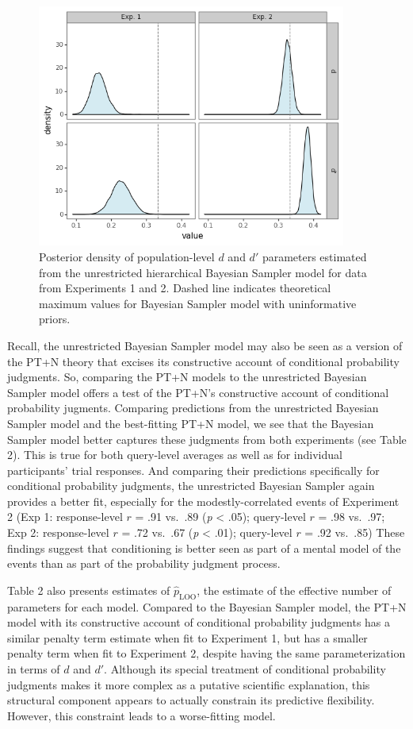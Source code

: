 \documentclass[
  man,floatsintext]{apa6}
\begin{document}
\begin{figure}[ht]
\centering
\includegraphics[width=4in]{plot_params.png}
\caption{Posterior density of population-level $d$  and $d'$ parameters estimated from the unrestricted hierarchical Bayesian Sampler model for data from Experiments 1 and 2. Dashed line indicates theoretical maximum values for Bayesian Sampler model with uninformative priors.}
\end{figure}

Recall, the unrestricted Bayesian Sampler model may also be seen as a version of the PT+N theory that excises its constructive account of conditional probability judgments. So, comparing the PT+N models to the unrestricted Bayesian Sampler model offers a test of the PT+N's constructive account of conditional probability jugments. Comparing predictions from the unrestricted Bayesian Sampler model and the best-fitting PT+N model, we see that the Bayesian Sampler model better captures these judgments from both experiments (see Table 2). This is true for both query-level averages as well as for individual participants' trial responses. And comparing their predictions specifically for conditional probability judgments, the unrestricted Bayesian Sampler again provides a better fit, especially for the modestly-correlated events of Experiment 2 (Exp 1: response-level \(r\) = .91 vs.~.89 (\emph{p} \textless{} .05); query-level \(r\) = .98 vs.~.97; Exp 2: response-level \(r\) = .72 vs.~.67 (\emph{p} \textless{} .01); query-level \(r\) = .92 vs.~.85) These findings suggest that conditioning is better seen as part of a mental model of the events than as part of the probability judgment process.

Table 2 also presents estimates of \(\hat{p}_{\text{LOO}}\), the estimate of the effective number of parameters for each model. Compared to the Bayesian Sampler model, the PT+N model with its constructive account of conditional probability judgments has a similar penalty term estimate when fit to Experiment 1, but has a smaller penalty term when fit to Experiment 2, despite having the same parameterization in terms of \(d\) and \(d'\). Although its special treatment of conditional probability judgments makes it more complex as a putative scientific explanation, this structural component appears to actually constrain its predictive flexibility. However, this constraint leads to a worse-fitting model.
\end{document}
